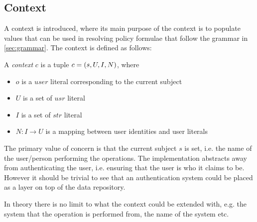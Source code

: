 \subsection{Context}
A context is introduced, where its main purpose of the context is to populate values that can be used in resolving policy formulae that follow the grammar in \autoref{sec:grammar}. The context is defined as follows:
\begin{definition}[Context]
A \emph{context} $c$ is a tuple $c = \left( s, U, I, N \right)$, where
\begin{itemize}
    \item $o$ is a $user$ literal corresponding to the current subject
    \item $U$ is a set of $usr$ literal
    \item $I$ is a set of $str$ literal
    \item $N : I \rightarrow U$ is a mapping between user identities and user literals
\end{itemize}
\end{definition}
The primary value of concern is that the current subject $s$ is set, i.e. the name of the user/person performing the operations. The implementation abstracts away from authenticating the user, i.e. ensuring that the user is who it claims to be. However it should be trivial to see that an authentication system could be placed as a layer on top of the data repository.

In theory there is no limit to what the context could be extended with, e.g. the system that the operation is performed from, the name of the system etc.



